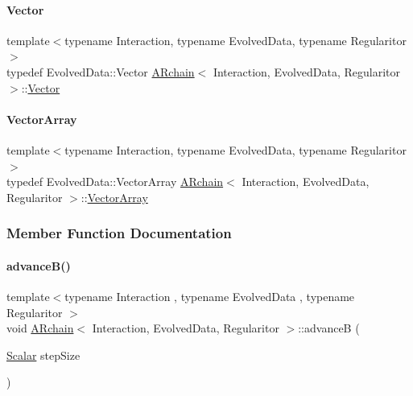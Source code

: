 \mbox{\label{class_a_rchain_ab9b518a463f750eb54e002842b66e8dd}} 
\paragraph{\texorpdfstring{Vector}{Vector}}
{\footnotesize\ttfamily template$<$typename Interaction, typename Evolved\+Data, typename Regularitor$>$ \\
typedef Evolved\+Data\+::\+Vector \mbox{\hyperlink{class_a_rchain}{A\+Rchain}}$<$ Interaction, Evolved\+Data, Regularitor $>$\+::\mbox{\hyperlink{class_a_rchain_ab9b518a463f750eb54e002842b66e8dd}{Vector}}}

\mbox{\label{class_a_rchain_a019fbadb9f4e5892736d9127537338bb}} 
\paragraph{\texorpdfstring{Vector\+Array}{VectorArray}}
{\footnotesize\ttfamily template$<$typename Interaction, typename Evolved\+Data, typename Regularitor$>$ \\
typedef Evolved\+Data\+::\+Vector\+Array \mbox{\hyperlink{class_a_rchain}{A\+Rchain}}$<$ Interaction, Evolved\+Data, Regularitor $>$\+::\mbox{\hyperlink{class_a_rchain_a019fbadb9f4e5892736d9127537338bb}{Vector\+Array}}}



\subsubsection{Member Function Documentation}
\mbox{\label{class_a_rchain_a1b2ae6231caeba3df20e4ab41f63a4b8}} 
\paragraph{\texorpdfstring{advance\+B()}{advanceB()}}
{\footnotesize\ttfamily template$<$typename Interaction , typename Evolved\+Data , typename Regularitor $>$ \\
void \mbox{\hyperlink{class_a_rchain}{A\+Rchain}}$<$ Interaction, Evolved\+Data, Regularitor $>$\+::advanceB (\begin{DoxyParamCaption}\item[{\mbox{\hyperlink{class_a_rchain_a707e42a79e4744424a34c9007e84ee07}{Scalar}}}]{step\+Size }\end{DoxyParamCaption})\hspace{0.3cm}{\ttfamily [private]}}



